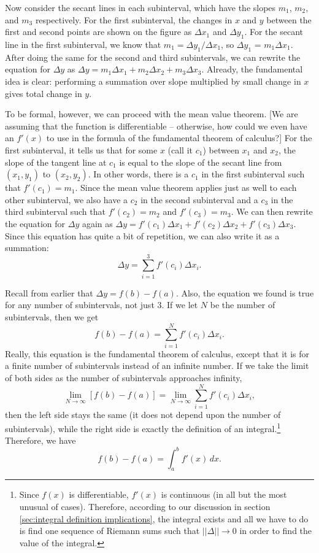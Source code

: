 \documentclass{myarticle}
\theoremstyle{nospace}
\newtheorem{old series theorem}{Theorem}
\newenvironment{series theorem}
{\begin{mdframed}\begin{old series theorem}}
    {\end{old series theorem}\end{mdframed}}
\begin{document}
Now consider the secant lines in each subinterval, which have the
slopes $m_1$, $m_2$, and $m_3$ respectively. For the first
subinterval, the changes in $x$ and $y$ between the first and second
points are shown on the figure as $\Delta x_1$ and $\Delta y_1$. For
the secant line in the first subinterval, we know that
$m_1 = \Delta y_1/\Delta x_1$, so $\Delta y_1$ = $m_1 \Delta x_1$.
After doing the same for the second and third subintervals, we can
rewrite the equation for $\Delta y$ as
$\Delta y = m_1\Delta x_1 + m_2\Delta x_2 + m_3\Delta x_3$. Already,
the fundamental idea is clear: performing a summation over slope
multiplied by small change in $x$ gives total change in $y$.

To be formal, however, we can proceed with the mean value theorem. [We
are assuming that the function is differentiable -- otherwise, how
could we even have an $f'(x)$ to use in the formula of the fundamental
theorem of calculus?] For the first subinterval, it tells us that for
some $x$ (call it $c_1$) between $x_1$ and $x_2$, the slope of the
tangent line at $c_1$ is equal to the slope of the secant line from
$(x_1, y_1)$ to $(x_2, y_2)$. In other words, there is a $c_1$ in the
first subinterval such that $f'(c_1) = m_1$. Since the mean value
theorem applies just as well to each other subinterval, we also have a
$c_2$ in the second subinterval and a $c_3$ in the third subinterval
such that $f'(c_2) = m_2$ and $f'(c_3) = m_3$. We can then rewrite the
equation for $\Delta y$ again as
$\Delta y = f'(c_1)\Delta x_1 + f'(c_2)\Delta x_2 + f'(c_3)\Delta
x_3$. Since this equation has quite a bit of repetition, we can also
write it as a summation:
\[
  \Delta y = \sum_{i=1}^3 f'(c_i)\Delta x_i.
\]

Recall from earlier that $\Delta y = f(b) - f(a)$. Also, the equation
we found is true for any number of subintervals, not just 3. If we let
$N$ be the number of subintervals, then we get
\[
  f(b) - f(a) = \sum_{i=1}^N f'(c_i)\Delta x_i.
\]
Really, this equation is the fundamental theorem of calculus, except
that it is for a finite number of subintervals instead of an infinite
number. If we take the limit of both sides as the number of
subintervals approaches infinity,
\[
  \lim_{N \to \infty} [f(b) - f(a)]
  = \lim_{N \to \infty} \sum_{i=1}^N f'(c_i)\Delta x_i,
\]
then the left side stays the same (it does not depend upon the number
of subintervals), while the right side is exactly the definition of an
integral.\footnote{Since $f(x)$ is differentiable, $f'(x)$ is
  continuous (in all but the most unusual of cases\footnotemark).
  Therefore, according to our discussion in section \ref{sec:integral
    definition implications}, the integral exists and all we have to
  do is find one sequence of Riemann sums such that $||\Delta|| \to 0$
  in order to find the value of the integral.} Therefore, we have
\[
  f(b) - f(a) = \int_a^b f'(x) \,dx.
\]
\end{document}
